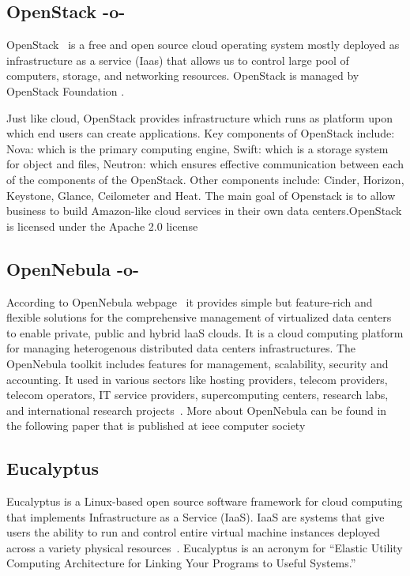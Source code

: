 \subsection{OpenStack -o-}
 
OpenStack~\cite{www-OpenStack.org} is a free and open source cloud
operating system mostly deployed as infrastructure as a service (Iaas)
that allows us to control large pool of computers, storage, and
networking resources.  OpenStack is managed by OpenStack Foundation
\cite{www-OpenStack-Found}.
     
Just like cloud, OpenStack provides infrastructure which runs as
platform upon which end users can create applications. Key components
of OpenStack include: Nova: which is the primary computing engine,
Swift: which is a storage system for object and files, Neutron: which
ensures effective communication between each of the components of the
OpenStack. Other components include: Cinder, Horizon, Keystone,
Glance, Ceilometer and Heat. The main goal of Openstack is to allow
business to build Amazon-like cloud services in their own data
centers.OpenStack is licensed under the Apache 2.0 license
\cite{www-apache-license}
	
\subsection{OpenNebula -o-}

According to OpenNebula webpage~\cite{www-opennebula-org} it provides
simple but feature-rich and flexible solutions for the comprehensive
management of virtualized data centers to enable private, public and
hybrid laaS clouds. It is a cloud computing platform for managing
heterogenous distributed data centers infrastructures. The OpenNebula
toolkit includes features for management, scalability, security and
accounting. It used in various sectors like hosting providers, telecom
providers, telecom operators, IT service providers, supercomputing
centers, research labs, and international research
projects~\cite{www-opennebula-wiki}. More about OpenNebula can be
found in the following paper that is published at ieee computer
society~\cite{paper-opennebula}
     
\subsection{Eucalyptus}

Eucalyptus is a Linux-based open source software framework for cloud
computing that implements Infrastructure as a Service (IaaS). IaaS are
systems that give users the ability to run and control entire virtual
machine instances deployed across a variety physical
resources~\cite{paper-eucalyptus}. Eucalyptus is an acronym for
``Elastic Utility Computing Architecture for Linking Your Programs to
Useful Systems.''

